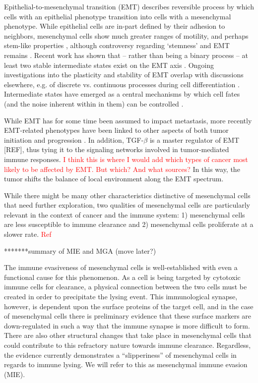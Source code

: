 \documentclass[11pt, preprint]{article}
\newcommand{\tcr} { \textcolor{red} }
\begin{document}
\par
Epithelial-to-mesenchymal transition (EMT) describes reversible process by which cells with an epithelial phenotype transition into cells with a mesenchymal phenotype.
While epithelial cells are in-part defined by their adhesion to neighbors, mesenchymal cells show much greater ranges of motility, and perhaps stem-like properties \cite{nieto2016emt}, although controversy regarding `stemness' and EMT remains \cite{nie18_stem, sha19_intermediate}.  
Recent work has shown that -- rather than being a binary process -- at least two stable intermediate states exist on the EMT axis \cite{hong2015ovol2, jolly15_coupling}. Ongoing investigations into the plasticity and stability of EMT overlap with discussions elsewhere, e.g. of discrete vs. continuous processes during cell differentiation \cite{moris16_transition}. Intermediate states have emerged as a central mechanisms by which cell fates (and the noise inherent within in them) can be controlled \cite{maclean18_exploring, ta16_controlling, rackauckas18_meanindependent}. 
\par 
While EMT has for some time been assumed to impact metastasis, more recently EMT-related phenotypes have been linked to other aspects of both tumor initiation and progression \cite{nieto2016emt}. In addition, TGF-$\beta$ is a master regulator of EMT [REF], thus tying it to the signaling networks involved in tumor-mediated immune responses. 
\tcr{I think this is where I would add which types of cancer most likely to be affected by EMT. But which? And what sources?}
In this way, the tumor shifts the balance of local environment along the EMT spectrum.



While there might be many other characteristics distinctive of mesenchymal cells that need further exploration, two qualities of mesenchymal cells are particularly relevant in the context of cancer and the immune system:
1) mesenchymal cells are less susceptible to immune clearance\cite{terry2017new} and
%
2) mesenchymal cells proliferate at a slower rate. \tcr{Ref}





*******summary of MIE and MGA (move later?)

The immune evasiveness of mesenchymal cells is well-established with even a functional cause for this phenomenon.
As a cell is being targeted by cytotoxic immune cells for clearance, a physical connection between the two cells must be created in order to precipitate the lysing event.
This immunological synapse, however, is dependent upon the surface proteins of the target cell, and in the case of mesenchymal cells there is preliminary evidence that these surface markers are down-regulated in such a way that the immune synapse is more difficult to form\cite{terry2017new}.
There are also other structural changes that take place in mesenchymal cells that could contribute to this refractory nature towards immune clearance.
Regardless, the evidence currently demonstrates a ``slipperiness'' of mesenchymal cells in regards to immune lysing.
We will refer to this as mesenchymal immune evasion (MIE).
\end{document}
